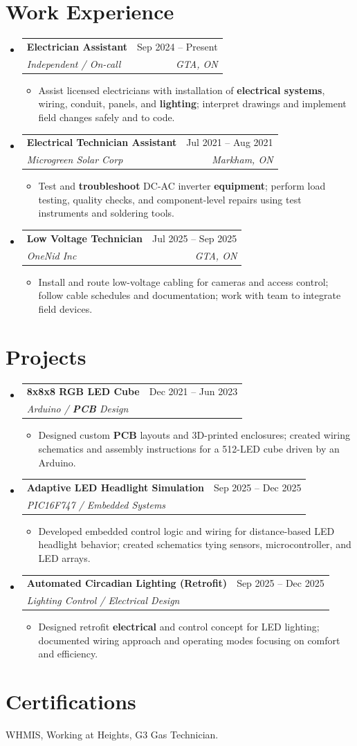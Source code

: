 \documentclass[letterpaper,11pt]{article}
\makeatletter
\newcommand{\resumeItem}[1]{\item\small{{#1 \vspace{-2pt}}}}
\newcommand{\resumeSubheading}[4]{
  \vspace{-4pt}\item
    \begin{tabular*}{0.97\textwidth}[t]{l@{\extracolsep{\fill}}r}
      \textbf{#1} & #2 \\
      \textit{\small #3} & \textit{\small #4} \\
    \end{tabular*}\vspace{-8pt}
}
\newcommand{\resumeSubHeadingListStart}{\begin{itemize}[leftmargin=0.15in, label={}]}
\newcommand{\resumeSubHeadingListEnd}{\end{itemize}}
\newcommand{\resumeItemListStart}{\begin{itemize}}
\newcommand{\resumeItemListEnd}{\end{itemize}\vspace{-5pt}}
\makeatother
\begin{document}
\section{Work Experience}
\resumeSubHeadingListStart

\resumeSubheading
  {Electrician Assistant}{Sep 2024 -- Present}
  {Independent / On-call}{GTA, ON}
\resumeItemListStart
  \resumeItem{Assist licensed electricians with installation of \textbf{electrical systems}, wiring, conduit, panels, and \textbf{lighting}; interpret drawings and implement field changes safely and to code.}
\resumeItemListEnd

\resumeSubheading
  {Electrical Technician Assistant}{Jul 2021 -- Aug 2021}
  {Microgreen Solar Corp}{Markham, ON}
\resumeItemListStart
  \resumeItem{Test and \textbf{troubleshoot} DC-AC inverter \textbf{equipment}; perform load testing, quality checks, and component-level repairs using test instruments and soldering tools.}
\resumeItemListEnd

\resumeSubheading
  {Low Voltage Technician}{Jul 2025 -- Sep 2025}
  {OneNid Inc}{GTA, ON}
\resumeItemListStart
  \resumeItem{Install and route low-voltage cabling for cameras and access control; follow cable schedules and documentation; work with team to integrate field devices.}
\resumeItemListEnd

\resumeSubHeadingListEnd

\section{Projects}
\resumeSubHeadingListStart
\resumeSubheading
  {8x8x8 RGB LED Cube}{Dec 2021 -- Jun 2023}
  {Arduino / \textbf{PCB} Design}{ }
\resumeItemListStart
  \resumeItem{Designed custom \textbf{PCB} layouts and 3D-printed enclosures; created wiring schematics and assembly instructions for a 512-LED cube driven by an Arduino.}
\resumeItemListEnd

\resumeSubheading
  {Adaptive LED Headlight Simulation}{Sep 2025 -- Dec 2025}
  {PIC16F747 / Embedded Systems}{ }
\resumeItemListStart
  \resumeItem{Developed embedded control logic and wiring for distance-based LED headlight behavior; created schematics tying sensors, microcontroller, and LED arrays.}
\resumeItemListEnd

\resumeSubheading
  {Automated Circadian Lighting (Retrofit)}{Sep 2025 -- Dec 2025}
  {Lighting Control / Electrical Design}{ }
\resumeItemListStart
  \resumeItem{Designed retrofit \textbf{electrical} and control concept for LED lighting; documented wiring approach and operating modes focusing on comfort and efficiency.}
\resumeItemListEnd
\resumeSubHeadingListEnd

\section{Certifications}
WHMIS, Working at Heights, G3 Gas Technician.
\end{document}

